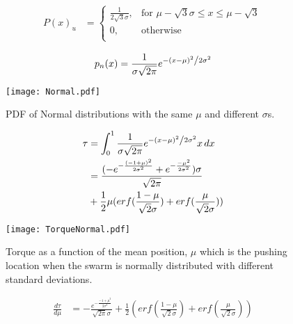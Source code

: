 \begin{align}
P(x)_{u} &=  \left\{
\begin{array}{ll}
    \frac{1}{2\sqrt{3}\sigma}, &  \textrm{for   } \mu-\sqrt{3}\sigma \leq x \leq \mu-\sqrt{3}\\
     0, & \textrm{otherwise}\\
\end{array} 
\right.
\end{align}

\begin{equation}
p_n(x) = \frac{1}{{\sigma \sqrt {2\pi } }}e^{{{ - \left( {x - \mu } \right)^2 } \mathord{\left/ {\vphantom {{ - \left( {x - \mu } \right)^2 } {2\sigma ^2 }}} \right. \kern-\nulldelimiterspace} {2\sigma ^2 }}}
\end{equation}
\begin{figure}
\begin{center}
	\texttt{[image: Normal.pdf]}
\end{center}
\vspace{-1em}
\caption{\label{fig:pdfNorm}
PDF of Normal distributions with the same $\mu$ and different $\sigma$s.
}
\vspace{-1em}
\end{figure}


\begin{align} \nonumber
\tau &= \int_0^1\frac{1}{{\sigma \sqrt {2\pi } }}e^{{{ - \left( {x - \mu } \right)^2 } \mathord{\left/ {\vphantom {{ - \left( {x - \mu } \right)^2 } {2\sigma ^2 }}} \right. \kern-\nulldelimiterspace} {2\sigma ^2 }}} x \, dx\\ \nonumber
&= \frac{(-e^{-\frac{(-1+\mu)^2}{2\sigma^2}}+e^{-\frac{-\mu^2}{2\sigma^2}})\sigma}{\sqrt{2\pi}}\\ 
&+ \frac{1}{2}\mu(erf(\frac{1-\mu}{\sqrt{2}\sigma})+erf(\frac{\mu}{\sqrt{2}\sigma})) 
\end{align}
\begin{figure}
\begin{center}
	\texttt{[image: TorqueNormal.pdf]}
\end{center}
\vspace{-1em}
\caption{\label{fig:torqueNorm}
Torque as a function of the mean position, $\mu$ which is the pushing location when the swarm is normally distributed with different standard deviations.
}
\vspace{-1em}
\end{figure}
\begin{align} 
\frac{d\tau}{d\mu} &= -\frac{e^{-\frac{{-1+\mu}^2}{2\sigma^2}}}{\sqrt{2\pi}\sigma} + \frac{1}{2}(erf(\frac{1-\mu}{\sqrt{2}\sigma})+erf(\frac{\mu}{\sqrt{2}\sigma})) 
\end{align}


